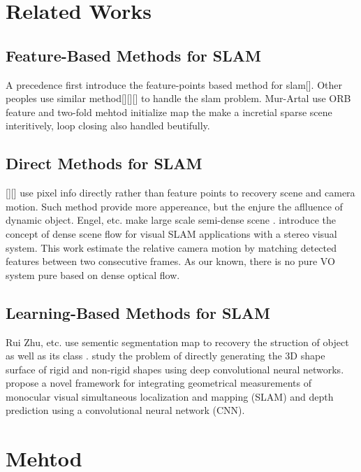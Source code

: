 \documentclass{article}
\begin{document}
\section{Related Works}

\subsection{Feature-Based Methods for SLAM}

A precedence first introduce the feature-points based method for slam[]. Other peoples use similar method[][][] to handle the slam problem. Mur-Artal use ORB feature and two-fold mehtod initialize map the make a incretial sparse scene interitively, loop closing also handled beutifully.

\subsection{Direct Methods for SLAM}

[][] use pixel info directly rather than feature points to recovery scene and camera motion. Such method provide more appereance, but the enjure the aflluence of dynamic object. Engel, etc. make large scale semi-dense scene \cite{Engel2014LSD}.
\cite{Alcantarilla2012On} introduce the concept of dense scene flow for visual SLAM applications with a stereo visual system. This work estimate the relative camera motion by matching detected features between two consecutive frames.  As our known, there is no pure VO system pure based on dense optical flow.

\subsection{Learning-Based Methods for SLAM}

Rui Zhu, etc. use sementic segmentation map to recovery the struction of object as well as its class \cite{Rui2018Semantic}. \cite{Sinha2017SurfNet} study the problem of directly generating the 3D shape surface of rigid and non-rigid shapes using deep convolutional neural networks. \cite{Mukasa_2017_ICCV} propose a novel framework for integrating geometrical measurements of monocular visual simultaneous localization and mapping (SLAM) and depth prediction using a convolutional neural network (CNN).

\section{Mehtod}
\end{document}
